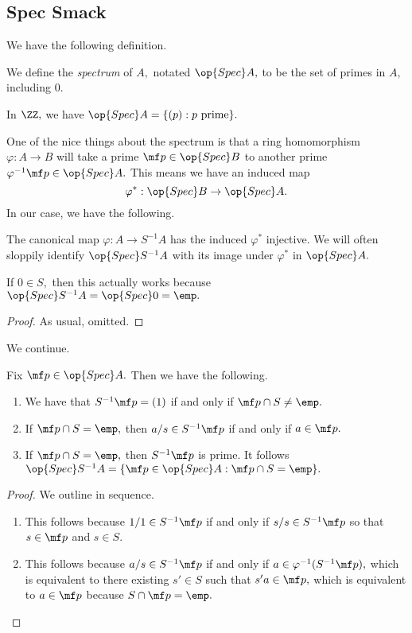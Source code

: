 \documentclass[../notes.tex]{subfiles}
\begin{document}
\subsection{Spec Smack}
We have the following definition.
\begin{definition}[Spectrum]
    We define the \textit{spectrum} of $A,$ notated $\op{Spec}A,$ to be the set of primes in $A,$ including $0.$
\end{definition}
\begin{example}
    In $\ZZ,$ we have $\op{Spec}A=\{(p):p\text{ prime}\}.$
\end{example}
One of the nice things about the spectrum is that a ring homomorphism $\varphi:A\to B$ will take a prime $\mf p\in\op{Spec}B$ to another prime $\varphi^{-1}\mf p\in\op{Spec}A.$ This means we have an induced map
\[\varphi^*:\op{Spec}B\to\op{Spec}A.\]
In our case, we have the following.
\begin{proposition}
    The canonical map $\varphi:A\to S^{-1}A$ has the induced $\varphi^*$ injective. We will often sloppily identify $\op{Spec}S^{-1}A$ with its image under $\varphi^*$ in $\op{Spec}A.$
\end{proposition}
\begin{remark}
    If $0\in S,$ then this actually works because $\op{Spec}S^{-1}A=\op{Spec}0=\emp.$
\end{remark}
\begin{proof}
    As usual, omitted.
\end{proof}
We continue.
\begin{proposition}
    Fix $\mf p\in\op{Spec}A.$ Then we have the following.
    \begin{enumerate}[label=(\alph*)]
        \item We have that $S^{-1}\mf p=(1)$ if and only if $\mf p\cap S\ne\emp.$
        \item If $\mf p\cap S=\emp,$ then $a/s\in S^{-1}\mf p$ if and only if $a\in\mf p.$
        \item If $\mf p\cap S=\emp,$ then $S^{-1}\mf p$ is prime. It follows $\op{Spec}S^{-1}A=\{\mf p\in\op{Spec}A:\mf p\cap S=\emp\}.$
    \end{enumerate}
\end{proposition}
\begin{proof}
    We outline in sequence.
    \begin{enumerate}[label=(\alph*)]
        \item This follows because $1/1\in S^{-1}\mf p$ if and only if $s/s\in S^{-1}\mf p$ so that $s\in\mf p$ and $s\in S.$
        \item This follows because $a/s\in S^{-1}\mf p$ if and only if $a\in\varphi^{-1}(S^{-1}\mf p),$ which is equivalent to there existing $s'\in S$ such that $s'a\in\mf p,$ which is equivalent to $a\in\mf p$ because $S\cap\mf p=\emp.$
        \qedhere
    \end{enumerate}
\end{proof}
\end{document}
